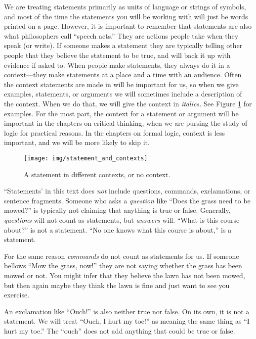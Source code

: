 We are treating statements primarily as units of language or strings of symbols, and most of the time the statements you will be working with will just be words printed on a page. However, it is important to remember that statements are also what philosophers call ``speech acts.'' They are actions people take when they speak (or write). If someone makes a statement they are typically telling other people that they believe the statement to be true, and will back it up with evidence if asked to. When people make statements, they always do it in a context---they make statements at a place and a time with an audience. Often the context statements are made in will be important for us, so when we give examples, statements, or arguments we will sometimes include a description of the context. When we do that, we will give the context in \textit{italics.} See Figure \ref{fig:statements_and_context} for examples. \label{context_marker} For the most part, the context for a statement or argument will be important in the chapters on critical thinking, when we are pursing the study of logic for practical reasons. In the chapters on formal logic, context is less important, and we will be more likely to skip it. 

\begin{figure}
\begin{mdframed}[style=mytableclearbox]
\texttt{[image: img/statement\_and\_contexts]}
\end{mdframed}
\caption{A statement in different contexts, or no context.} \label{fig:statements_and_context}
\end{figure}


``Statements' in this text does \emph{not} include questions, commands, exclamations, or sentence fragments. Someone who asks a \emph{question} like ``Does the grass need to be mowed?'' is typically not claiming that anything is true or false. Generally, \emph{questions} will not count as statements, but \emph{answers} will. ``What is this course about?'' is not a statement. ``No one knows what this course is about,'' is a statement.

For the same reason \emph{commands} do not count as statements for us. If someone bellows ``Mow the grass, now!'' they are not saying whether the grass has been mowed or not. You might infer that they believe the lawn has not been mowed, but then again maybe they think the lawn is fine and just want to see you exercise. 

An exclamation like ``Ouch!'' is also neither true nor false. On its own, it is not a statement. We will treat ``Ouch, I hurt my toe!'' as meaning the same thing as ``I hurt my toe.'' The ``ouch'' does not add anything that could be true or false.

